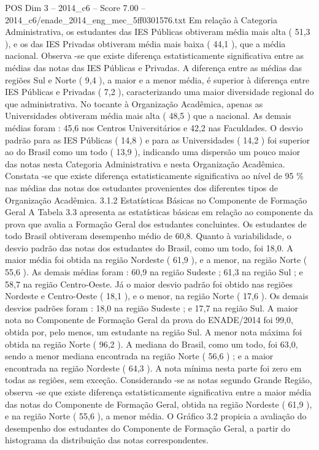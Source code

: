 \begin{textsample}{POS Dim 3 – 2014\_c6 – Score 7.00 – 2014\_c6/enade\_2014\_eng\_mec\_5ff0301576.txt}
Em relação à Categoria Administrativa, os estudantes das IES Públicas obtiveram média mais alta ( 51,3 ), e os das IES Privadas obtiveram média mais baixa ( 44,1 ), que a média nacional.
Observa -se que existe diferença estatisticamente significativa entre as médias das notas das IES Públicas e Privadas.
A diferença entre as médias das regiões Sul e Norte ( 9,4 ), a maior e a menor média, é superior à diferença entre IES Públicas e Privadas ( 7,2 ), caracterizando uma maior diversidade regional do que administrativa.
No tocante à Organização Acadêmica, apenas as Universidades obtiveram média mais alta ( 48,5 ) que a nacional.
As demais médias foram : 45,6 nos Centros Universitários e 42,2 nas Faculdades.
O desvio padrão para as IES Públicas ( 14,8 ) e para as Universidades ( 14,2 ) foi superior ao do Brasil como um todo ( 13,9 ), indicando uma dispersão um pouco maior das notas nesta Categoria Administrativa e nesta Organização Acadêmica.
Constata -se que existe diferença estatisticamente significativa ao nível de 95 \% nas médias das notas dos estudantes provenientes dos diferentes tipos de Organização Acadêmica. 3.1.2 Estatísticas Básicas no Componente de Formação Geral A Tabela 3.3 apresenta as estatísticas básicas em relação ao componente da prova que avalia a Formação Geral dos estudantes concluintes.
Os estudantes de todo Brasil obtiveram desempenho médio de 60,8.
Quanto à variabilidade, o desvio padrão das notas dos estudantes do Brasil, como um todo, foi 18,0.
A maior média foi obtida na região Nordeste ( 61,9 ), e a menor, na região Norte ( 55,6 ).
As demais médias foram : 60,9 na região Sudeste ; 61,3 na região Sul ; e 58,7 na região Centro-Oeste.
Já o maior desvio padrão foi obtido nas regiões Nordeste e Centro-Oeste ( 18,1 ), e o menor, na região Norte ( 17,6 ).
Os demais desvios padrões foram : 18,0 na região Sudeste ; e 17,7 na região Sul.
A maior nota no Componente de Formação Geral da prova do ENADE/2014 foi 99,0, obtida por, pelo menos, um estudante na região Sul.
A menor nota máxima foi obtida na região Norte ( 96,2 ).
A mediana do Brasil, como um todo, foi 63,0, sendo a menor mediana encontrada na região Norte ( 56,6 ) ; e a maior encontrada na região Nordeste ( 64,3 ).
A nota mínima nesta parte foi zero em todas as regiões, sem exceção.
Considerando -se as notas segundo Grande Região, observa -se que existe diferença estatisticamente significativa entre a maior média das notas do Componente de Formação Geral, obtida na região Nordeste ( 61,9 ), e na região Norte ( 55,6 ), a menor média.
O Gráfico 3.2 propicia a avaliação do desempenho dos estudantes do Componente de Formação Geral, a partir do histograma da distribuição das notas correspondentes.

\end{textsample}
